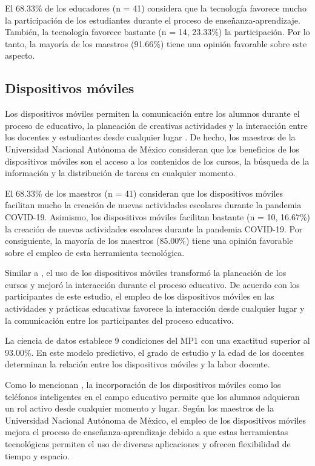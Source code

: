 \documentclass[spanish]{textolivre}
\begin{document}
El 68.33\% de los educadores (n = 41) considera que la tecnología favorece mucho la participación de los estudiantes durante el proceso de enseñanza-aprendizaje. También, la tecnología favorece bastante (n = 14, 23.33\%) la participación. Por lo tanto, la mayoría de los maestros (91.66\%) tiene una opinión favorable sobre este aspecto.

\subsection{Dispositivos móviles}
Los dispositivos móviles permiten la comunicación entre los alumnos durante el proceso de educativo, la planeación de creativas actividades y la interacción entre los docentes y estudiantes desde cualquier lugar \cite{gezgin2018, li2019, padmo2019}. De hecho, los maestros de la Universidad Nacional Autónoma de México consideran que los beneficios de los dispositivos móviles son el acceso a los contenidos de los cursos, la búsqueda de la información y la distribución de tareas en cualquier momento.

El 68.33\% de los maestros (n = 41) consideran que los dispositivos móviles facilitan mucho la creación de nuevas actividades escolares durante la pandemia COVID-19. Asimismo, los dispositivos móviles facilitan bastante (n = 10, 16.67\%) la creación de nuevas actividades escolares durante la pandemia COVID-19. Por consiguiente, la mayoría de los maestros (85.00\%) tiene una opinión favorable sobre el empleo de esta herramienta tecnológica.

Similar a \textcite{li2019}, el uso de los dispositivos móviles transformó la planeación de los cursos y mejoró la interacción durante el proceso educativo. De acuerdo con los participantes de este estudio, el empleo de los dispositivos móviles en las actividades y prácticas educativas favorece la interacción desde cualquier lugar y la comunicación entre los participantes del proceso educativo.

La ciencia de datos establece 9 condiciones del MP1 con una exactitud superior al 93.00\%. En este modelo predictivo, el grado de estudio y la edad de los docentes determinan la relación entre los dispositivos móviles y la labor docente.

Como lo mencionan \textcite{padmo2019}, la incorporación de los dispositivos móviles como los teléfonos inteligentes en el campo educativo permite que los alumnos adquieran un rol activo desde cualquier momento y lugar. Según los maestros de la Universidad Nacional Autónoma de México, el empleo de los dispositivos móviles mejora el proceso de enseñanza-aprendizaje debido a que estas herramientas tecnológicas permiten el uso de diversas aplicaciones y ofrecen flexibilidad de tiempo y espacio.
\end{document}

